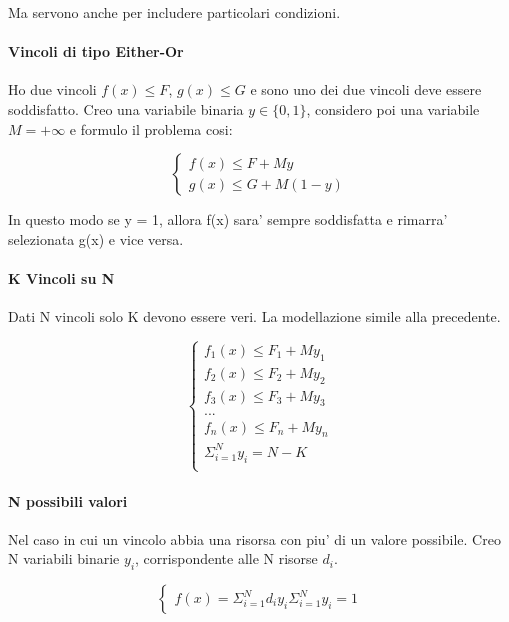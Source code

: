 Ma servono anche per includere particolari condizioni. \\

\paragraph{Vincoli di tipo Either-Or}

Ho due vincoli $f(x) \leq F$, $g(x) \leq G$ e sono uno dei due vincoli deve essere soddisfatto.
Creo una variabile binaria $y \in \{0,1\}$, considero poi una variabile $M = +\infty$ e formulo il problema cosi:

\[
    \begin{cases}
        f(x) \leq F + My \\
        g(x) \leq G + M(1-y)
    \end{cases}
\]

In questo modo se y = 1, allora f(x) sara' sempre soddisfatta e rimarra' selezionata g(x) e vice versa.

\paragraph{K Vincoli su N}

Dati N vincoli solo K devono essere veri.
La modellazione simile alla precedente.

\[
    \begin{cases}
        f_1(x) \leq F_1 + My_1 \\
        f_2(x) \leq F_2 + My_2 \\
        f_3(x) \leq F_3 + My_3 \\
         ... \\
        f_n(x) \leq F_n + My_n \\
        \Sigma^N_{i=1} y_i = N - K \\
    \end{cases}
\]

\paragraph{N possibili valori}

Nel caso in cui un vincolo abbia una risorsa con piu' di un valore possibile.
Creo N variabili binarie $y_i$, corrispondente alle N risorse $d_i$.

\[
    \begin{cases}
        f(x) = \Sigma^N_{i=1} d_i y_i
        \Sigma^N_{i=1} y_i = 1
    \end{cases}
\]

